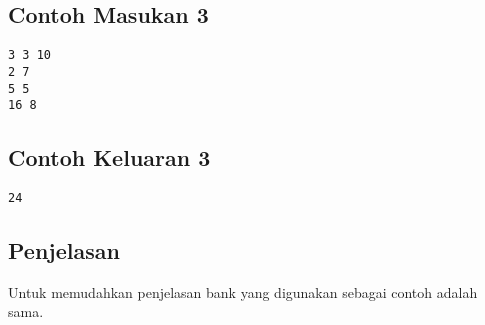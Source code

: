 \documentclass{article}
\begin{document}
\begin{multicols}{2}
\subsection*{Contoh Masukan 3}
\begin{lstlisting}
3 3 10
2 7
5 5
16 8
\end{lstlisting}
\columnbreak
\subsection*{Contoh Keluaran 3}
\begin{lstlisting}
24
\end{lstlisting}
\end{multicols}

\subsection*{Penjelasan}
Untuk memudahkan penjelasan bank yang digunakan sebagai contoh adalah sama.
\end{document}
